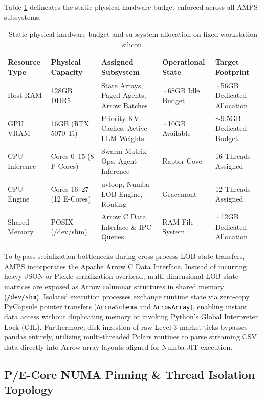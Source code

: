 Table \ref{tab:hardware_budget_allocation} delineates the static physical hardware budget enforced across all AMPS subsystems.

\begin{table}[htbp]
\centering
\small
\begin{tabularx}{\textwidth}{l p{2.8cm} p{3.2cm} p{2.2cm} X}
\toprule
\textbf{Resource Type} & \textbf{Physical Capacity} & \textbf{Assigned Subsystem} & \textbf{Operational State} & \textbf{Target Footprint} \\
\midrule
Host RAM & 128GB DDR5 & State Arrays, Paged Agents, Arrow Batches & $\sim$68GB Idle Budget & $\sim$56GB Dedicated Allocation \\
GPU VRAM & 16GB (RTX 5070 Ti) & Priority KV-Caches, Active LLM Weights & $\sim$10GB Available & $\sim$9.5GB Dedicated Budget \\
CPU Inference & Cores 0--15 (8 P-Cores) & Swarm Matrix Ops, Agent Inference & Raptor Cove & 16 Threads Assigned \\
CPU Engine & Cores 16--27 (12 E-Cores) & uvloop, Numba LOB Engine, Routing & Gracemont & 12 Threads Assigned \\
Shared Memory & POSIX (/dev/shm) & Arrow C Data Interface \& IPC Queues & RAM File System & $\sim$12GB Dedicated Allocation \\
\bottomrule
\end{tabularx}
\caption{Static physical hardware budget and subsystem allocation on fixed workstation silicon.}
\label{tab:hardware_budget_allocation}
\end{table}

To bypass serialization bottlenecks during cross-process LOB state transfers, AMPS incorporates the Apache Arrow C Data Interface. Instead of incurring heavy JSON or Pickle serialization overhead, multi-dimensional LOB state matrices are exposed as Arrow columnar structures in shared memory (\texttt{/dev/shm}). Isolated execution processes exchange runtime state via zero-copy PyCapsule pointer transfers (\texttt{ArrowSchema} and \texttt{ArrowArray}), enabling instant data access without duplicating memory or invoking Python's Global Interpreter Lock (GIL). Furthermore, disk ingestion of raw Level-3 market ticks bypasses pandas entirely, utilizing multi-threaded Polars routines to parse streaming CSV data directly into Arrow array layouts aligned for Numba JIT execution.

\subsection{P/E-Core NUMA Pinning \& Thread Isolation Topology}

